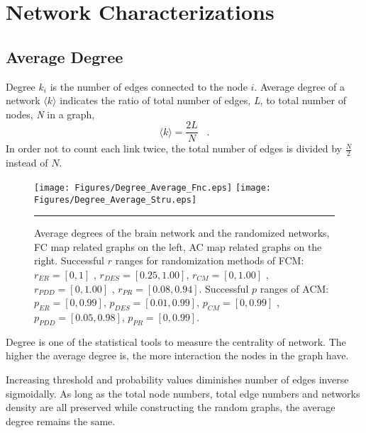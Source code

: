 
\chapter{Network Characterizations} %

\label{AppendixB} %


\section{Average Degree}

Degree $k_i$ is the number of edges connected to the node $i$. Average degree of a network $\langle k \rangle$ indicates the ratio of total number of edges, \textit{L}, to total number of nodes, \textit{N} in a graph,
\begin{equation}
\langle k \rangle = \frac{2L}{N} \;\;\;.
\end{equation} 
In order not to count each link twice, the total number of edges is divided by $\frac{N}{2}$ instead of $N$. 
 \begin{figure}[htbp]
 
  \centering
	 \texttt{[image: Figures/Degree\_Average\_Fnc.eps]}
	 \texttt{[image: Figures/Degree\_Average\_Stru.eps]}
	\rule{35em}{0.5pt}	  
  \caption[Average Degree]{Average degrees of the brain network and the randomized networks, FC map related graphs on the left, AC map related graphs on the right. Successful $r$ ranges for randomization methods of FCM:  $r_{ER}=[0,1]$ , $r_{DES} = [0.25,1.00]$, $r_{CM} = [0,1.00]$ , $r_{PDD} = [0,1.00]$ , $r_{PR} = [0.08,0.94]$. Successful $p$ ranges of ACM: $p_{ER}=[0,0.99]$, $p_{DES}=[0.01 , 0.99]$, $p_{CM}=[0, 0.99]$ , $p_{PDD}=[0.05 , 0.98]$, $p_{PR} = [0,0.99]$.} 
    \label{fig:Average Degree}
 	
\end{figure}  


Degree is one of the statistical tools to measure the centrality of network. The higher the average degree is, the more interaction the nodes in the graph have. 

Increasing threshold and probability values diminishes number of edges inverse sigmoidally. As long as the total node numbers, total edge numbers and networks density are all preserved while constructing the random graphs, the average degree remains the same. 

